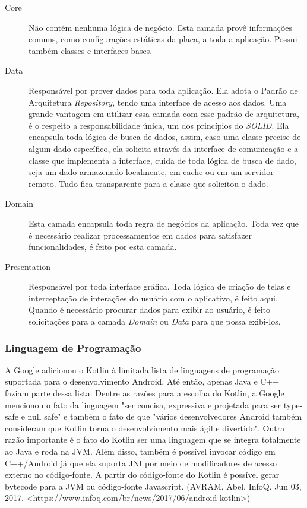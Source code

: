 \documentclass[
	12pt,				%
	oneside,			%
	a4paper,			%
	brazil				%
]{abntex2}
\begin{document}
{\begin{description}

\item[Core] Não contém nenhuma lógica de negócio. Esta camada provê informações comuns, como configurações estáticas da placa, a toda a aplicação. Possui também classes e interfaces bases.

\item[Data] Responsável por prover dados para toda aplicação. Ela adota o Padrão de Arquitetura \textit{Repository}, tendo uma interface de acesso aos dados. Uma grande vantagem em utilizar essa camada com esse padrão de arquitetura, é o respeito a responsabilidade única, um dos princípios do \textit{SOLID}. Ela encapsula toda lógica de busca de dados, assim, caso uma classe precise de algum dado específico, ela solicita através da interface de comunicação e a classe que implementa a interface, cuida de toda lógica de busca de dado, seja um dado armazenado localmente, em cache ou em um servidor remoto. Tudo fica transparente para a classe que solicitou o dado.

\item[Domain] Esta camada encapsula toda regra de negócios da aplicação. Toda vez que é necessário realizar processamentos em dados para satisfazer funcionalidades, é feito por esta camada.

\item[Presentation] Responsável por toda interface gráfica. Toda lógica de criação de telas e interceptação de interações do usuário com o aplicativo, é feito aqui. Quando é necessário procurar dados para exibir ao usuário, é feito solicitações para a camada \textit{Domain} ou \textit{Data} para que possa exibi-los.
 
\end{description}

\subsubsection{Linguagem de Programação}

A Google adicionou o Kotlin à limitada lista de linguagens de programação suportada para o desenvolvimento Android. Até então, apenas Java e C++ faziam parte dessa lista. Dentre as razões para a escolha do Kotlin, a Google mencionou o fato da linguagem "ser concisa, expressiva e projetada para ser type-safe e null safe" e também o fato de que "vários desenvolvedores Android também consideram que Kotlin torna o desenvolvimento mais ágil e divertido". Outra razão importante é o fato do Kotlin ser uma linguagem que se integra totalmente ao Java e roda na JVM. Além disso, também é possível invocar código em C++/Android já que ela suporta JNI por meio de modificadores de acesso externo no código-fonte. A partir do código-fonte do Kotlin é possível gerar bytecode para a JVM ou código-fonte Javascript. (AVRAM, Abel. InfoQ. Jun 03, 2017. <https://www.infoq.com/br/news/2017/06/android-kotlin>)

}
\end{document}
